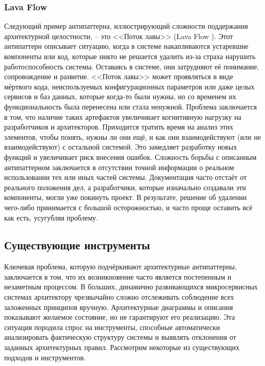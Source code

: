 \subsubsection{Lava Flow}

Следующий пример антипаттерна, иллюстрирующий сложности поддержания архитектурной целостности, – это <<Поток лавы>> (Lava Flow \cite{lava-flow-ap}). Этот антипаттерн описывает ситуацию, когда в системе накапливаются устаревшие компоненты или код, которые никто не решается удалить из-за страха нарушить работоспособность системы. Оставаясь в системе, они затрудняют её понимание, сопровождение и развитие.
<<Поток лавы>> может проявляться в виде мёртвого кода, неиспользуемых конфигурационных параметров или даже целых сервисов и баз данных, которые когда-то были нужны, но со временем их функциональность была перенесена или стала ненужной. Проблема заключается в том, что наличие таких артефактов увеличивает когнитивную нагрузку на разработчиков и архитекторов. Приходится тратить время на анализ этих элементов, чтобы понять, нужны ли они ещё, и как они взаимодействуют (или не взаимодействуют) с остальной системой. Это замедляет разработку новых функций и увеличивает риск внесения ошибок.
Сложность борьбы с описанным антипаттерном заключается в отсутствии точной информации о реальном использовании тех или иных частей системы. Документация часто отстаёт от реального положения дел, а разработчики, которые изначально создавали эти компоненты, могли уже покинуть проект. В результате, решение об удалении чего-либо принимается с большой осторожностью, и часто проще оставить всё как есть, усугубляя проблему.

\subsection{Существующие инструменты}

Ключевая проблема, которую подчёркивают архитектурные антипаттерны, заключается в том, что их возникновение часто является постепенным и незаметным процессом. В больших, динамично развивающихся микросервисных системах архитектору чрезвычайно сложно отслеживать соблюдение всех заложенных принципов вручную. Архитектурные диаграммы и описания показывают желаемое состояние, но не гарантируют его реализацию. Эта ситуация породила спрос на инструменты, способные автоматически анализировать фактическую структуру системы и выявлять отклонения от заданных архитектурных правил. Рассмотрим некоторые из существующих подходов и инструментов.

